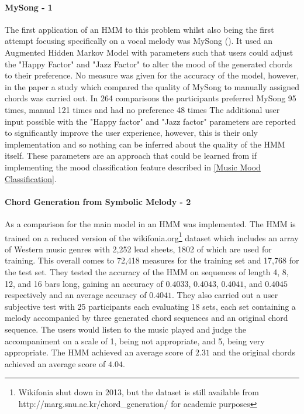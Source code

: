 \paragraph{MySong - 1} The first application of an HMM to this problem whilst also being the first attempt focusing specifically on a vocal melody was MySong (\cite{MySong}).
It used an Augmented Hidden Markov Model with parameters such that users could adjust the "Happy Factor" and "Jazz Factor" to alter the mood of the generated chords to their preference.
No measure was given for the accuracy of the model, however, in the paper a study which compared the quality of MySong to manually assigned chords was carried out. 
In 264 comparisons the participants preferred MySong 95 times, manual 121 times and had no preference 48 times
The additional user input possible with the "Happy factor" and "Jazz factor" parameters are reported to significantly improve the user experience, however, this is their only implementation and so nothing can be inferred about the quality of the HMM itself.
These parameters are an approach that could be learned from if implementing the mood classification feature described in \cref{Music Mood Classification}.

\paragraph{Chord Generation from Symbolic Melody - 2}  As a comparison for the main model in  an HMM was implemented. 
The HMM is trained on a reduced version of the 
wikifonia.org\footnote{Wikifonia shut down in 2013, but the dataset is still available from http://marg.snu.ac.kr/chord\_generation/ for academic purposes} dataset which includes an array of Western music genres with 2,252 lead sheets, 1802 of which are used for training. 
This overall comes to 72,418 measures for the training set and 17,768 for the test set. 
They tested the accuracy of the HMM on sequences of length 4, 8, 12, and 16 bars long, gaining an accuracy of $0.4033$, $0.4043$, $0.4041$, and $0.4045$ respectively and an average accuracy of $0.4041$.
They also carried out a user subjective test with 25 participants each evaluating 18 sets, each set containing a melody accompanied by three generated chord sequences and an original chord sequence.
The users would listen to the music played and judge the accompaniment on a scale of 1, being not appropriate, and 5, being very appropriate.
The HMM achieved an average score of $2.31$ and the original chords achieved an average score of $4.04$.


